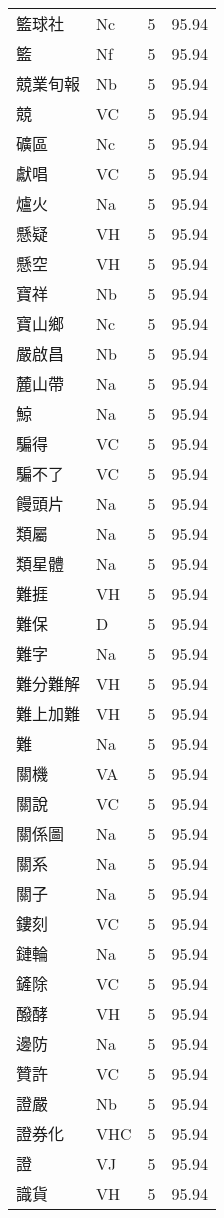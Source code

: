 \documentclass[twocolumn]{book}
\begin{document}
\begin{supertabular}{llrr}
籃球社 & Nc & 5 &  95.94\\
籃 & Nf & 5 &  95.94\\
競業旬報 & Nb & 5 &  95.94\\
競 & VC & 5 &  95.94\\
礦區 & Nc & 5 &  95.94\\
獻唱 & VC & 5 &  95.94\\
爐火 & Na & 5 &  95.94\\
懸疑 & VH & 5 &  95.94\\
懸空 & VH & 5 &  95.94\\
寶祥 & Nb & 5 &  95.94\\
寶山鄉 & Nc & 5 &  95.94\\
嚴啟昌 & Nb & 5 &  95.94\\
麓山帶 & Na & 5 &  95.94\\
鯨 & Na & 5 &  95.94\\
騙得 & VC & 5 &  95.94\\
騙不了 & VC & 5 &  95.94\\
饅頭片 & Na & 5 &  95.94\\
類屬 & Na & 5 &  95.94\\
類星體 & Na & 5 &  95.94\\
難捱 & VH & 5 &  95.94\\
難保 & D & 5 &  95.94\\
難字 & Na & 5 &  95.94\\
難分難解 & VH & 5 &  95.94\\
難上加難 & VH & 5 &  95.94\\
難 & Na & 5 &  95.94\\
關機 & VA & 5 &  95.94\\
關說 & VC & 5 &  95.94\\
關係圖 & Na & 5 &  95.94\\
關系 & Na & 5 &  95.94\\
關子 & Na & 5 &  95.94\\
鏤刻 & VC & 5 &  95.94\\
鏈輪 & Na & 5 &  95.94\\
鏟除 & VC & 5 &  95.94\\
醱酵 & VH & 5 &  95.94\\
邊防 & Na & 5 &  95.94\\
贊許 & VC & 5 &  95.94\\
證嚴 & Nb & 5 &  95.94\\
證券化 & VHC & 5 &  95.94\\
證 & VJ & 5 &  95.94\\
識貨 & VH & 5 &  95.94\\

\end{supertabular}
\end{document}
